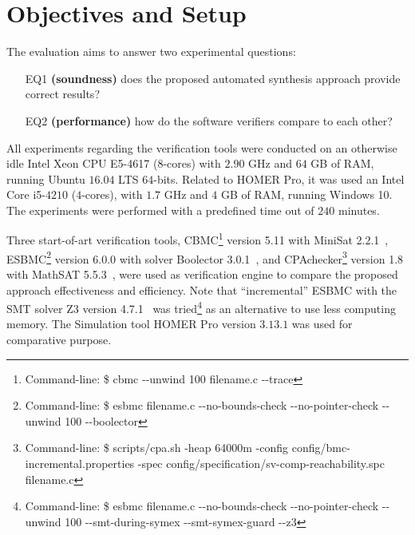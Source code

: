 \section{Objectives and Setup}
\label{sec:synthesissetup} 

The evaluation aims to answer two experimental questions: 

\begin{enumerate}

\item[EQ1] \textbf{(soundness)} does the proposed automated synthesis approach provide correct results?

\item[EQ2] \textbf{(performance)} how do the software verifiers compare to each other?

\end{enumerate}

All experiments regarding the verification tools were conducted 
on an otherwise idle Intel Xeon CPU E5-4617 ($8$-cores) with 
$2.90$ GHz and $64$ GB of RAM, running Ubuntu $16.04$ LTS $64$-bits. 
Related to HOMER Pro, it was used an Intel Core i5-$4210$ ($4$-cores), 
with $1.7$ GHz and $4$ GB of RAM, running Windows 10. 
The experiments were performed with a predefined time out of $240$ minutes.

Three start-of-art verification tools, CBMC\footnote{Command-line: \$ cbmc -\phantom{}-unwind 100 filename.c -\phantom{}-trace} version 5.11 with MiniSat 2.2.1~\cite{Kroening}, ESBMC\footnote{Command-line: \$ esbmc filename.c -\phantom{}-no-bounds-check -\phantom{}-no-pointer-check -\phantom{}-unwind 100 -\phantom{}-boolector} version 6.0.0 with solver Boolector 3.0.1~\cite{Brummayer}, %
and CPAchecker\footnote{Command-line: \$ scripts/cpa.sh -heap 64000m -config config/bmc-incremental.properties -spec config/specification/sv-comp-reachability.spc filename.c} version 1.8 with MathSAT 5.5.3~\cite{mathsat5}, were used as verification engine to compare the proposed approach effectiveness and efficiency. Note that ``incremental'' ESBMC with the SMT solver Z3 version 4.7.1~\cite{DeMoura} was tried\footnote{Command-line: \$ esbmc filename.c -\phantom{}-no-bounds-check -\phantom{}-no-pointer-check -\phantom{}-unwind 100 -\phantom{}-smt-during-symex -\phantom{}-smt-symex-guard -\phantom{}-z3} as an alternative to use less computing memory. The Simulation tool HOMER Pro version $3.13.1$ was used for comparative purpose.

